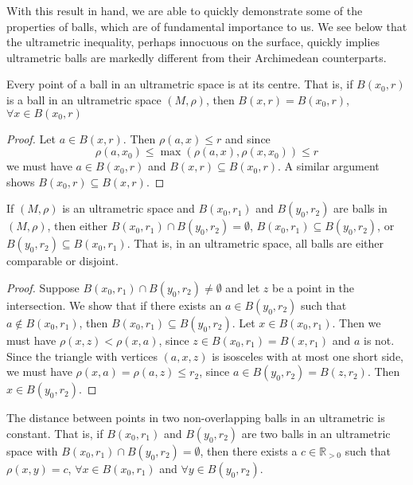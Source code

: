 With this result in hand, we are able to quickly demonstrate some of the properties of balls, which are of fundamental importance to us. We see below that the ultrametric inequality, perhaps innocuous on the surface, quickly implies ultrametric balls are markedly different from their Archimedean counterparts.\\

\begin{proposition}
 Every point of a ball in an ultrametric space is at its centre. That is, if $B(x_0, r)$ is a ball in an ultrametric space $(M,\rho)$, then $B(x, r)=B(x_0, r)$,  $\forall x \in B(x_0, r)$
\end{proposition}

\begin{proof}
Let $a \in B(x, r)$. Then $\rho(a,x) \leq r$ and since \[\rho(a,x_0) \leq \max(\rho(a,x), \rho(x,x_0)) \leq r\] we must have $a \in B(x_0, r)$ and  $B(x, r) \subseteq B(x_0, r)$. A similar argument shows $B(x_0, r) \subseteq B(x, r)$.
\end{proof}

\begin{proposition}
	If $(M, \rho)$ is an ultrametric space and $B(x_0, r_1)$ and $B(y_0, r_2)$ are balls in $(M, \rho)$, then either $B(x_0, r_1) \cap B(y_0, r_2) = \emptyset$, $B(x_0, r_1) \subseteq B(y_0, r_2)$, or $B(y_0, r_2) \subseteq B(x_0, r_1)$. That is, in an ultrametric space, all balls are either comparable or disjoint.
\end{proposition}

\begin{proof}
Suppose $B(x_0, r_1) \cap B(y_0, r_2) \neq \emptyset$ and let $z$ be a point in the intersection. We show that if there exists an $a \in B(y_0, r_2)$ such that $a \notin B(x_0,r_1)$, then $B(x_0, r_1) \subseteq B(y_0, r_2)$. Let $x \in B(x_0, r_1)$. Then we must have $\rho(x,z) < \rho(x,a)$, since $z \in B(x_0, r_1) = B(x,r_1)$ and $a$ is not. Since the triangle with vertices $(a,x,z)$ is isosceles with at most one short side, we must have $\rho(x,a) = \rho(a,z) \leq r_2$, since $a \in B(y_0, r_2) = B(z,r_2)$. Then $x \in B(y_0, r_2)$. 
\end{proof}

\begin{proposition}
 The distance between points in  two non-overlapping balls in an ultrametric is constant. That is, if $B(x_0, r_1)$ and $B(y_0, r_2)$ are two balls in an ultrametric space with $B(x_0, r_1) \cap B(y_0, r_2) = \emptyset$, then there exists a $c \in \mathbb{R}_{> 0}$ such that  $\rho(x,y)=c$, $\forall x \in B(x_0, r_1)$ and $\forall y \in B(y_0, r_2)$.
\end{proposition}

